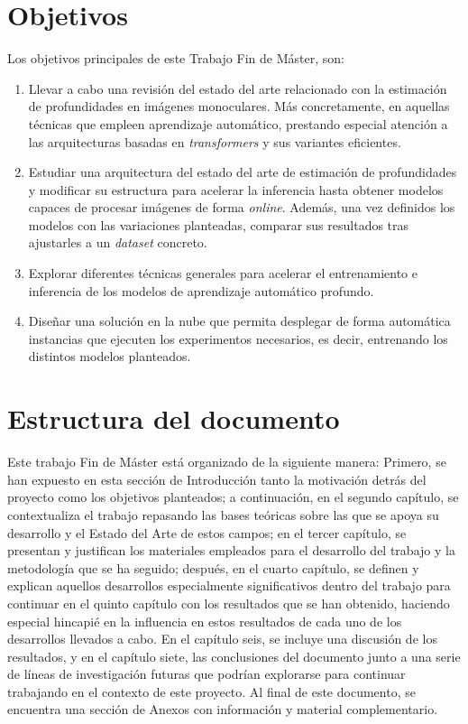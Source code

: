 \section{Objetivos}
Los objetivos principales de este Trabajo Fin de Máster, son:
\begin{enumerate}
	\item Llevar a cabo una revisión del estado del arte relacionado con la estimación de profundidades en imágenes monoculares. Más concretamente, en aquellas técnicas que empleen aprendizaje automático, prestando especial atención a las arquitecturas basadas en \textit{transformers} y sus variantes eficientes.
    \item Estudiar una arquitectura del estado del arte de estimación de profundidades y modificar su estructura para acelerar la inferencia hasta obtener modelos capaces de procesar imágenes de forma \textit{online}. Además, una vez definidos los modelos con las variaciones planteadas, comparar sus resultados tras ajustarles a un \textit{dataset} concreto.
    \item Explorar diferentes técnicas generales para acelerar el entrenamiento e inferencia de los modelos de aprendizaje automático profundo.
    \item Diseñar una solución en la nube que permita desplegar de forma automática instancias que ejecuten los experimentos necesarios, es decir, entrenando los distintos modelos planteados.
\end{enumerate}


\section{Estructura del documento}
Este trabajo Fin de Máster está organizado de la siguiente manera: Primero, se han expuesto en esta sección de Introducción tanto la motivación detrás del proyecto como los objetivos planteados; a continuación, en el segundo capítulo, se contextualiza el trabajo repasando las bases teóricas sobre las que se apoya su desarrollo y el Estado del Arte de estos campos; en el tercer capítulo, se presentan y justifican los materiales empleados para el desarrollo del trabajo y la metodología que se ha seguido; después, en el cuarto capítulo, se definen y explican aquellos desarrollos especialmente significativos dentro del trabajo para continuar en el quinto capítulo con los resultados que se han obtenido, haciendo especial hincapié en la influencia en estos resultados de cada uno de los desarrollos llevados a cabo. En el capítulo seis, se incluye una discusión de los resultados, y en el capítulo siete, las conclusiones del documento junto a una serie de líneas de investigación futuras que podrían explorarse para continuar trabajando en el contexto de este proyecto. Al final de este documento, se encuentra una sección de Anexos con información y material complementario.

\clearpage
